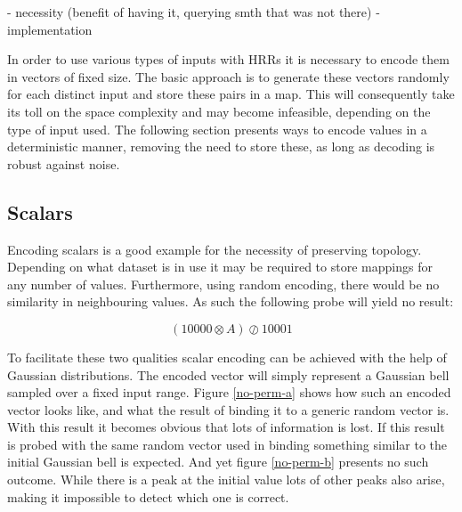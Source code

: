 \documentclass[conference]{IEEEtran}
\begin{document}
- necessity (benefit of having it, querying smth that was not there)
- implementation

In order to use various types of inputs with HRRs it is necessary to encode them in vectors of fixed size. The basic approach is to generate these vectors randomly for each distinct input and store these pairs in a map. This will consequently take its toll on the space complexity and may become infeasible, depending on the type of input used. The following section presents ways to encode values in a deterministic manner, removing the need to store these, as long as decoding is robust against noise. 

\subsection{Scalars}

Encoding scalars is a good example for the necessity of preserving topology. Depending on what dataset is in use it may be required to store mappings for any number of values. Furthermore, using random encoding, there would be no similarity in neighbouring values. As such the following probe will yield no result:

\begin{equation}
(10000 \otimes A) \oslash 10001
\end{equation}

To facilitate these two qualities scalar encoding can be achieved with the help of Gaussian distributions. The encoded vector will simply represent a Gaussian bell sampled over a fixed input range. Figure \ref{no-perm-a} shows how such an encoded vector looks like, and what the result of binding it to a generic random vector is. With this result it becomes obvious that lots of information is lost. If this result is probed with the same random vector used in binding something similar to the initial Gaussian bell is expected. And yet figure \ref{no-perm-b} presents no such outcome. While there is a peak at the initial value lots of other peaks also arise, making it impossible to detect which one is correct. 
\end{document}
